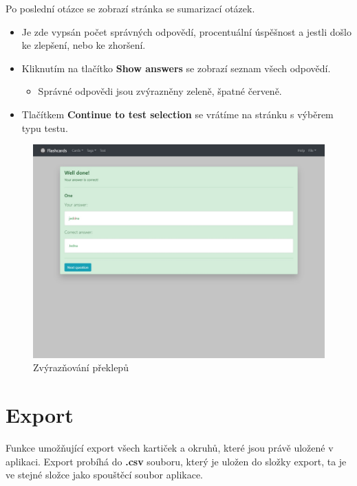 \documentclass[11pt]{article}
\providecommand{\tightlist}{\setlength{\itemsep}{1pt}\setlength{\parskip}{1pt}}
\begin{document}
Po poslední otázce se zobrazí stránka se sumarizací otázek.

\begin{itemize}
\tightlist
\item
  Je zde vypsán počet správných odpovědí, procentuální úspěšnost a
  jestli došlo ke zlepšení, nebo ke zhoršení.
\item
  Kliknutím na tlačítko \textbf{Show answers} se zobrazí seznam všech
  odpovědí.

  \begin{itemize}
  \tightlist
  \item
    Správné odpovědi jsou zvýrazněny zeleně, špatné červeně.
  \end{itemize}
\item
  Tlačítkem \textbf{Continue to test selection} se vrátíme na stránku s
  výběrem typu testu.
\end{itemize}

\begin{figure}
\centering
\includegraphics{assets/write_halfcorrect.jpg}
\caption{Zvýrazňování překlepů}
\end{figure}

\hypertarget{export}{%
\section{Export}\label{export}}

Funkce umožňující export všech kartiček a okruhů, které jsou právě
uložené v aplikaci. Export probíhá do \textbf{.csv} souboru, který je
uložen do složky export, ta je ve stejné složce jako spouštěcí soubor
aplikace.
\end{document}
